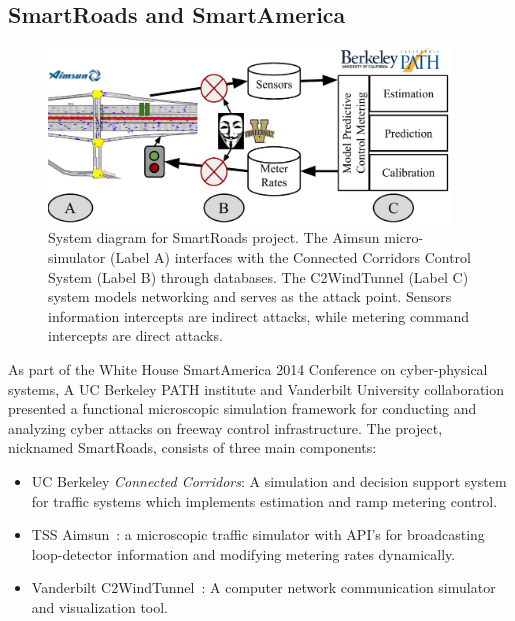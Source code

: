 \subsection{SmartRoads and SmartAmerica}

\begin{figure}[t]
    \centering
    \includegraphics[width=0.95\textwidth]{diagrams/smart-roads}
    \caption[System diagram for SmartRoads project depicting Aimsun microsimulator, Connected Corridors system, and C2WindTunnel software.]{System diagram for SmartRoads project. The Aimsun micro-simulator (Label A) interfaces with the Connected Corridors Control System (Label B) through databases. The C2WindTunnel (Label C) system models networking and serves as the attack point. Sensors information intercepts are indirect attacks, while metering command intercepts are direct attacks.}
    \label{fig:smart-roads-truck}
\end{figure}

As part of the White House SmartAmerica 2014 Conference on cyber-physical systems, A UC Berkeley PATH institute and Vanderbilt University collaboration presented a functional microscopic simulation framework for conducting and analyzing cyber attacks on freeway control infrastructure. The project, nicknamed SmartRoads, consists of three main components:

\begin{itemize}
    \item UC Berkeley \emph{Connected Corridors}: A simulation and decision support system for traffic systems which implements estimation and ramp metering control.
    \item TSS Aimsun~\cite{barcelo2005microscopic}: a microscopic traffic simulator with API's for broadcasting loop-detector information and modifying metering rates dynamically.
    \item Vanderbilt C2WindTunnel~\cite{chabukswar2010simulation}: A computer network communication simulator and visualization tool.
\end{itemize}

